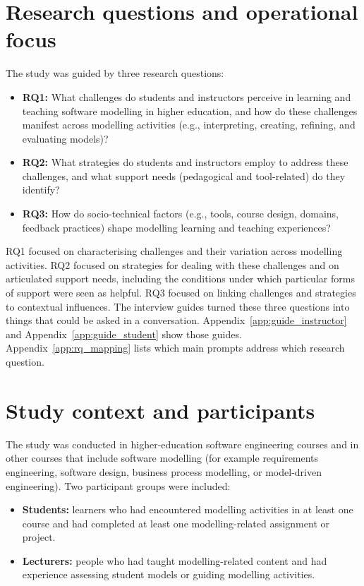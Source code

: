 \section{Research questions and operational focus}
\label{sec:method_rq}

The study was guided by three research questions:

\begin{itemize}
    \item \textbf{RQ1:} What challenges do students and instructors perceive in learning and teaching software modelling in higher education, and how do these challenges manifest across modelling activities (e.g., interpreting, creating, refining, and evaluating models)?
    \item \textbf{RQ2:} What strategies do students and instructors employ to address these challenges, and what support needs (pedagogical and tool-related) do they identify?
    \item \textbf{RQ3:} How do socio-technical factors (e.g., tools, course design, domains, feedback practices) shape modelling learning and teaching experiences?
\end{itemize}

RQ1 focused on characterising challenges and their variation across modelling activities. RQ2 focused on strategies for dealing with these challenges and on articulated support needs, including the conditions under which particular forms of support were seen as helpful. RQ3 focused on linking challenges and strategies to contextual influences. The interview guides turned these three questions into things that could be asked in a conversation. Appendix~\ref{app:guide_instructor} and Appendix~\ref{app:guide_student} show those guides. Appendix~\ref{app:rq_mapping} lists which main prompts address which research question.

\section{Study context and participants}
\label{sec:method_context_participants}

The study was conducted in higher-education software engineering courses and in other courses that include software modelling (for example requirements engineering, software design, business process modelling, or model-driven engineering). Two participant groups were included:

\begin{itemize}
    \item \textbf{Students:} learners who had encountered modelling activities in at least one course and had completed at least one modelling-related assignment or project.
    \item \textbf{Lecturers:} people who had taught modelling-related content and had experience assessing student models or guiding modelling activities.
\end{itemize}


